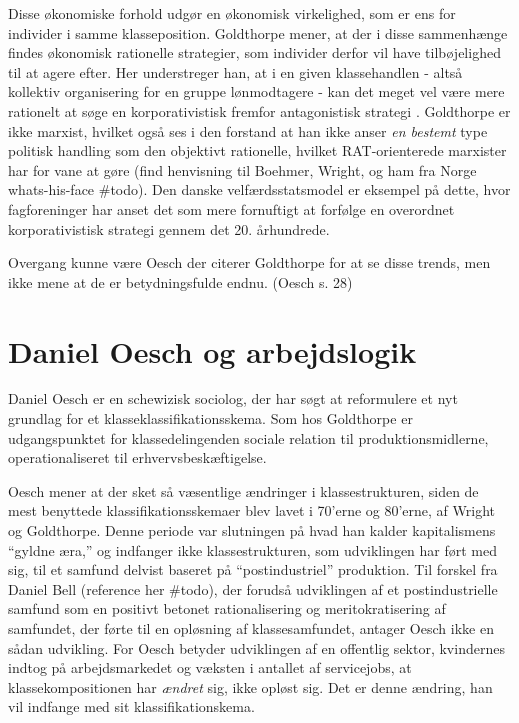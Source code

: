 Disse økonomiske forhold udgør en økonomisk virkelighed, som er ens for individer i samme klasseposition. Goldthorpe mener, at der i disse sammenhænge findes økonomisk rationelle strategier, som individer derfor vil have tilbøjelighed til at agere efter. Her understreger han, at i en given klassehandlen - altså kollektiv organisering for en gruppe lønmodtagere - kan det meget vel være mere rationelt at søge en korporativistisk fremfor antagonistisk strategi \parencite[215]{Goldthorpe2002}. Goldthorpe er ikke marxist, hvilket også ses i den forstand at han ikke anser \emph{en bestemt} type politisk handling som den objektivt rationelle, hvilket RAT-orienterede marxister har for vane at gøre (find henvisning til Boehmer, Wright, og ham fra Norge whats-his-face \#todo). Den danske velfærdsstatsmodel er eksempel på dette, hvor fagforeninger har anset det som mere fornuftigt at forfølge en overordnet korporativistisk strategi gennem det 20. århundrede. %

Overgang kunne være Oesch der citerer Goldthorpe for at se disse trends, men ikke mene at de er betydningsfulde endnu. (Oesch s. 28)


\section{Daniel Oesch og arbejdslogik  \label{sec_}}

Daniel Oesch er en schewizisk sociolog, der har søgt at reformulere et nyt grundlag for et klasseklassifikationsskema. Som hos Goldthorpe er udgangspunktet for klassedelingenden sociale relation til produktionsmidlerne, operationaliseret til erhvervsbeskæftigelse. 


Oesch mener at der sket så væsentlige ændringer i klassestrukturen, siden de mest benyttede klassifikationsskemaer blev lavet i 70'erne og 80'erne, af Wright og Goldthorpe. Denne periode var slutningen på hvad han kalder kapitalismens “gyldne æra,” og indfanger ikke klassestrukturen, som udviklingen har ført med sig, til et samfund delvist baseret på “postindustriel” produktion. Til forskel fra Daniel Bell (reference her \#todo), der forudså udviklingen af et postindustrielle samfund som en positivt betonet rationalisering og meritokratisering af samfundet, der førte til en opløsning af klassesamfundet, antager Oesch ikke en sådan udvikling. For Oesch betyder udviklingen af en offentlig sektor, kvindernes indtog på arbejdsmarkedet og  væksten i antallet af servicejobs, at klassekompositionen har \emph{ændret} sig, ikke opløst sig. Det er denne ændring, han vil indfange med sit klassifikationskema.  

